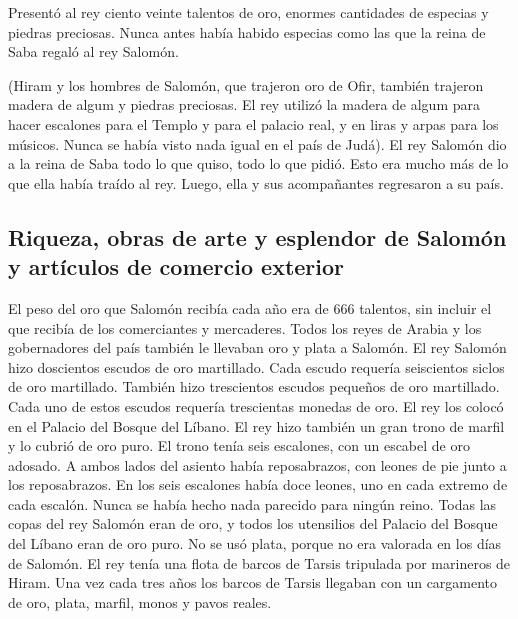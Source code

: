  Presentó al rey ciento veinte talentos de oro, enormes
cantidades de especias y piedras preciosas. Nunca antes había habido
especias como las que la reina de Saba regaló al rey Salomón.

 (Hiram y los hombres de Salomón, que trajeron oro de
Ofir, también trajeron madera de algum y piedras preciosas.
 El rey utilizó la madera de algum para hacer escalones
para el Templo y para el palacio real, y en liras y arpas para los
músicos. Nunca se había visto nada igual en el país de Judá).
 El rey Salomón dio a la reina de Saba todo lo que quiso,
todo lo que pidió. Esto era mucho más de lo que ella había traído al
rey. Luego, ella y sus acompañantes regresaron a su país.

\hypertarget{riqueza-obras-de-arte-y-esplendor-de-salomuxf3n-y-artuxedculos-de-comercio-exterior}{%
\subsection{Riqueza, obras de arte y esplendor de Salomón y artículos de
comercio
exterior}\label{riqueza-obras-de-arte-y-esplendor-de-salomuxf3n-y-artuxedculos-de-comercio-exterior}}

 El peso del oro que Salomón recibía cada año era de 666
talentos,  sin incluir el que recibía de los comerciantes
y mercaderes. Todos los reyes de Arabia y los gobernadores del país
también le llevaban oro y plata a Salomón.  El rey
Salomón hizo doscientos escudos de oro martillado. Cada escudo requería
seiscientos siclos de oro martillado.  También hizo
trescientos escudos pequeños de oro martillado. Cada uno de estos
escudos requería trescientas monedas de oro. El rey los colocó en el
Palacio del Bosque del Líbano.  El rey hizo también un
gran trono de marfil y lo cubrió de oro puro.  El trono
tenía seis escalones, con un escabel de oro adosado. A ambos lados del
asiento había reposabrazos, con leones de pie junto a los reposabrazos.
 En los seis escalones había doce leones, uno en cada
extremo de cada escalón. Nunca se había hecho nada parecido para ningún
reino.  Todas las copas del rey Salomón eran de oro, y
todos los utensilios del Palacio del Bosque del Líbano eran de oro puro.
No se usó plata, porque no era valorada en los días de Salomón.
 El rey tenía una flota de barcos de Tarsis tripulada por
marineros de Hiram. Una vez cada tres años los barcos de Tarsis llegaban
con un cargamento de oro, plata, marfil, monos y pavos reales.

